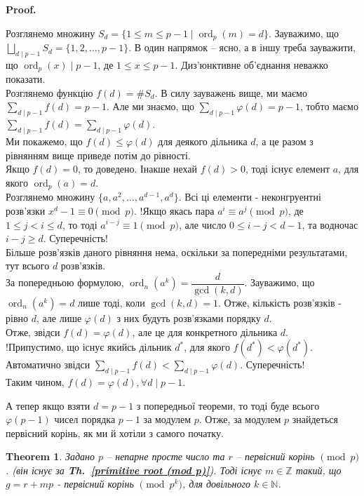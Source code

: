\documentclass[a4paper, 14pt]{extarticle}
\makeatletter
\theoremstyle{theoremdd}
\newtheorem{theorem}{Theorem}[subsection]
\theoremstyle{theoremdd}
\theoremstyle{theoremdd}
\theoremstyle{theoremdd}
\theoremstyle{theoremdd}
\theoremstyle{theoremdd}
\theoremstyle{theoremdd}
\theoremstyle{theoremdd}
\def\qed{$\blacksquare$}
\renewenvironment{proof}[1][Proof.\\]{\par
\pushQED{\hfill \qed}%
\normalfont \topsep6\p@\@plus6\p@\relax
\trivlist
\item\relax
{\bfseries
#1\@addpunct{.}}\hspace\labelsep\ignorespaces
}{%
\popQED\endtrivlist\@endpefalse
}
\DeclareMathOperator{\ord}{ord}
\newcommand\thref[1]{\textbf{Th.~\ref{#1}}}
\makeatother
\begin{document}
\begin{proof}
Розглянемо множину $S_d = \{ 1 \leq m \leq p-1 \mid \ord_p (m) = d \}$. Зауважимо, що $\displaystyle\bigsqcup_{d \mid p-1} S_d = \{1,2,\dots,p-1\}$. В один напрямок -- ясно, а в іншу треба зауважити, що $\ord_p (x) \mid p-1$, де $1 \leq x \leq p-1$. Диз'юнктивне об'єднання неважко показати.\\
Розглянемо функцію $f(d) = \# S_d$. В силу зауважень вище, ми маємо $\displaystyle\sum_{d \mid p-1} f(d) = p-1$. Але ми знаємо, що $\displaystyle\sum_{d \mid p-1} \varphi(d) = p-1$, тобто маємо \\ $\displaystyle\sum_{d \mid p-1} f(d) = \sum_{d \mid p-1} \varphi(d)$.\\
Ми покажемо, що $f(d) \leq \varphi(d)$ для деякого дільника $d$, а це разом з рівнянням вище приведе потім до рівності.\\
Якщо $f(d) = 0$, то доведено. Інакше нехай $f(d) > 0$, тоді існує елемент $a$, для якого $\ord_p (a) = d$.\\
Розглянемо множину $\{a,a^2,\dots,a^{d-1},a^d\}$. Всі ці елементи - неконгруентні розв'язки $x^d - 1 \equiv 0 \pmod p$. !Якщо якась пара $a^i \equiv a^j \pmod p$, де $1 \leq j < i \leq d$, то тоді $a^{i-j} \equiv 1 \pmod p$, але число $0 \leq i-j < d-1$, та водночас $i-j \geq d$. Суперечність!\\
Більше розв'язків даного рівняння нема, оскільки за попередніми результатами, тут всього $d$ розв'язків.\\
За попередньою формулою, $\ord_n (a^k) = \dfrac{d}{\gcd(k,d)}$. Зауважимо, що \\
$\ord_n (a^k) = d$ лише тоді, коли $\gcd(k,d) = 1$. Отже, кількість розв'язків - рівно $d$, але лише $\varphi(d)$ з них будуть розв'язками порядку $d$.\\
Отже, звідси $f(d) = \varphi(d)$, але це для конкретного дільника $d$.\\
!Припустимо, що існує якийсь дільник $d^*$, для якого $f(d^*) < \varphi(d^*)$. Автоматично звідси $\displaystyle\sum_{d \mid p-1} f(d) < \sum_{d \mid p-1} \varphi(d)$. Суперечність!\\
Таким чином, $f(d) = \varphi(d), \forall d \mid p-1$.
\end{proof}

А тепер якщо взяти $d = p-1$ з попередньої теореми, то тоді буде всього $\varphi(p-1)$ чисел порядка $p-1$ за модулем $p$. Отже, за модулем $p$ знайдеться первісний корінь, як ми й хотіли з самого початку.

\begin{theorem}
Задано $p$ -- непарне просте число та $r$ -- первісний корінь $\pmod p$. (він існує за \thref{primitive root (mod p)}). Тоді існує $m \in \mathbb{Z}$ такий, що $g = r+mp$ - первісний корінь $\pmod {p^k}$, для довільного $k \in \mathbb{N}$.
\end{theorem}
\end{document}

